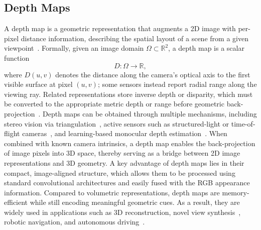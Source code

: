 \subsection{Depth Maps}
\label{subsec:p-2-sec-4-2D-depth-maps}
A depth map is a geometric representation that augments a 2D image with per-pixel distance information, describing the spatial layout of a scene from a given viewpoint~\cite{szeliski2022}. 
Formally, given an image domain $\Omega \subset \mathbb{R}^2$, a depth map is a scalar function
\begin{equation}
D: \Omega \rightarrow \mathbb{R},
\end{equation}
where $D(u,v)$ denotes the distance along the camera's optical axis to the first visible surface at pixel $(u,v)$; some sensors instead report radial range along the viewing ray.
Related representations store inverse depth or disparity, which must be converted to the appropriate metric depth or range before geometric back-projection~\cite{hartley2003multiple}.
Depth maps can be obtained through multiple mechanisms, including stereo vision via triangulation~\cite{hartley2003multiple}, active sensors such as structured-light or time-of-flight cameras~\cite{foix2011tof}, and learning-based monocular depth estimation~\cite{eigen2014depth}. 
When combined with known camera intrinsics, a depth map enables the back-projection of image pixels into 3D space, thereby serving as a bridge between 2D image representations and 3D geometry.
A key advantage of depth maps lies in their compact, image-aligned structure, which allows them to be processed using standard convolutional architectures and easily fused with the RGB appearance information. 
Compared to volumetric representations, depth maps are memory-efficient while still encoding meaningful geometric cues. 
As a result, they are widely used in applications such as 3D reconstruction, novel view synthesis~\cite{mildenhall2021nerf}, robotic navigation, and autonomous driving~\cite{KITTI-GeigerLU12}.


